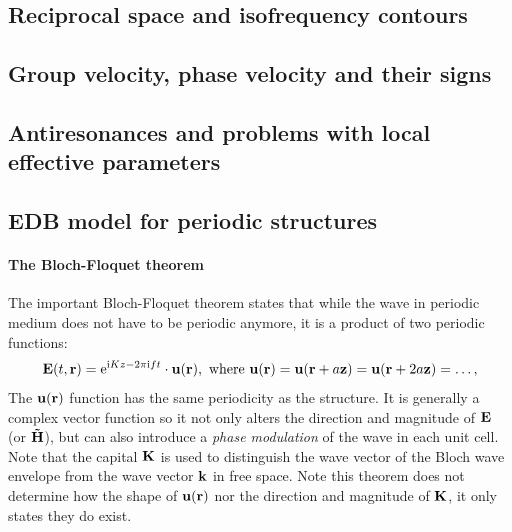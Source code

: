 \subsection{Reciprocal space and isofrequency contours}
\subsection{Group velocity, phase velocity and their signs}
\subsection{Antiresonances and problems with local effective parameters}
\subsection{EDB model for periodic structures}

\paragraph{The Bloch-Floquet theorem}%

The important Bloch-Floquet theorem states that while the wave in periodic medium does not have to be periodic anymore, it is a product of two periodic functions:
\begin{equation} \mathbf{E}(t, {\mathbf{r}}) = \mathrm{e}^{\mathrm{i} Kz - 2\pi \mathrm{i} f t} \cdot \mathbf{u}({\mathbf{r}}), \text{ where } \mathbf{u}({\mathbf{r}}) = \mathbf{u}({\mathbf{r}}+a\mathbf{z}) = \mathbf{u}({\mathbf{r}}+2a\mathbf{z}) = \ldots, \label{eq_bloch}\end{equation} 
The $\mathbf{u}({\mathbf{r}})$ function has the same periodicity as the structure. It is generally a complex vector function so it not only alters the direction and magnitude of $\mathbf{E}$ (or  $\mathbf{\tilde{H}}$), but can also introduce a \textit{phase modulation} of the wave in each unit cell. Note that the capital ${\mathbf{K}}$ is used to distinguish the wave vector of the Bloch wave envelope from the wave vector ${\mathbf{k}}$ in free space. Note this theorem does not determine how the shape of $\mathbf{u}({\mathbf{r}})$ nor the direction and magnitude of ${\mathbf{K}}$, it only states they do exist.

